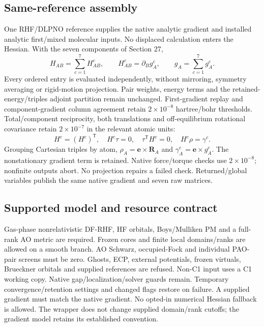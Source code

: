 \documentclass[11pt]{article}
\begin{document}
\subsection{Same-reference assembly}
One RHF/DLPNO reference supplies the native analytic gradient and installed
analytic first/mixed molecular inputs. No displaced calculation enters
the Hessian. With the seven components of Section 27,
\begin{equation}
 H_{AB}=\sum_{c=1}^{7}H^c_{AB},\qquad H^c_{AB}=\partial_B g^c_A,
 \qquad g_A=\sum_{c=1}^{7}g^c_A.
\end{equation}
Every ordered entry is evaluated independently, without mirroring,
symmetry averaging or rigid-motion projection. Pair weights, energy terms
and the retained-energy/triples adjoint partition remain unchanged.
First-gradient replay and component-gradient column agreement retain
$2\times10^{-8}$ hartree/bohr thresholds. Total/component reciprocity,
both translations and off-equilibrium rotational covariance retain
$2\times10^{-7}$ in the relevant atomic units:
\begin{equation}
 H^c=(H^c)^{\mathsf T},\quad H^c\tau=0,\quad
 \tau^{\mathsf T}H^c=0,\quad H^c\rho=\gamma^c.
\end{equation}
Grouping Cartesian triples by atom, $\rho_A=\mathbf e\times\mathbf R_A$
and $\gamma_A^c=\mathbf e\times g_A^c$. The nonstationary gradient term
is retained. Native force/torque checks use $2\times10^{-8}$; nonfinite
outputs abort. No projection repairs a failed check. Returned/global
variables publish the same native gradient and seven raw matrices.

\subsection{Supported model and resource contract}
Gas-phase nonrelativistic DF-RHF, HF orbitals, Boys/Mulliken PM and a
full-rank AO metric are required. Frozen cores and finite local domains/ranks
are allowed on a smooth branch. AO Schwarz, occupied-Fock and individual
PAO-pair screens must be zero. Ghosts, ECP, external potentials, frozen
virtuals, Brueckner orbitals and supplied references are refused.
Non-C1 input uses a C1 working copy. Native gap/localization/solver guards
remain. Temporary convergence/retention settings and changed flags restore
on failure. A supplied gradient must match the native gradient. No opted-in
numerical Hessian fallback is allowed. The wrapper does not change supplied
domain/rank cutoffs; the gradient model retains its established convention.
\end{document}
